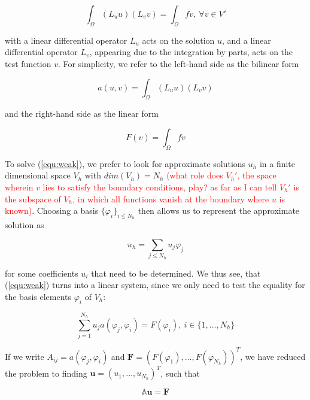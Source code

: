 \documentclass[11pt, a4paper]{article}
\begin{document}
\begin{equation}
    \int_{\Omega} (L_u u) (L_v v) = \int_{\Omega} f v, ~\forall v \in V' \label{equ:weak}
\end{equation}

with a linear differential operator $L_u$ acts on the solution $u$, and a linear 
differential operator $L_v$, appearing due to the integration by parts, acts on 
the test function $v$. For simplicity, we refer to the left-hand side as the 
bilinear form

\begin{equation}
    a(u, v) = \int_{\Omega} (L_u u) (L_v v)
\end{equation}

and the right-hand side as the linear form

\begin{equation}
    F(v) = \int_{\Omega} f v
\end{equation}

To solve (\ref{equ:weak}), we prefer to look for approximate solutions $u_h$ in a finite 
dimensional space $V_h$ with $dim(V_h) = N_h$ \textcolor{red}{(what role does $V_h'$,
the space wherein $v$ lies to satisfy the boundary conditions, play? as far as I can tell
$V_h'$ is the subspace of $V_h$, in which all functions vanish at the boundary where
$u$ is known)}. Choosing a basis $\{\varphi_i\}_{i \leq N_h}$
then allows us to represent the approximate solution as 

\begin{equation}
    u_h = \sum_{j \leq N_h} u_j \varphi_j
\end{equation}

for some coefficients $u_i$ that need to be determined. We thus see, that 
(\ref{equ:weak}) turns into a linear system, since we only need to test the 
equality for the basis elements $\varphi_i$ of $V_h$:

\begin{equation}
    \sum_{j=1}^{N_h} u_j a(\varphi_j, \varphi_i) = F(\varphi_i),~i \in \{1, \dots, N_h\}
\end{equation}

If we write $A_{ij} = a(\varphi_j, \varphi_i)$ and $\mathbf{F} = (F(\varphi_1), \dots, F(\varphi_{N_h}))^T$,
we have reduced the problem to finding $\mathbf{u} = (u_1, \dots, u_{N_h})^T$,
such that 

\begin{equation}
    \mathbb{A}\mathbf{u} = \mathbf{F}
\end{equation}
\end{document}
